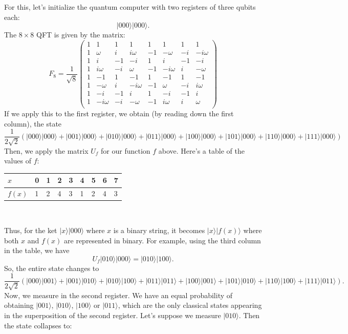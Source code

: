 \documentclass{article}
\theoremstyle{plain}
\theoremstyle{definition}
\theoremstyle{remark}
\numberwithin{theorem}{section}
\begin{document}
 For this, let's initialize the quantum computer with two registers of three qubits each:
 \[
 | 000\rangle |000 \rangle.
 \]
 The $8 \times 8$ QFT is given by the matrix:
	\[
					F_8 = \frac{1}{\sqrt{8}}
					\begin{pmatrix}
						1 & 1 & 1 & 1 & 1 & 1 & 1 & 1 \\
						1 & \omega & i & i\omega & -1 & -\omega & -i & -i\omega \\
						1 & i & -1 & -i & 1 & i & -1 & -i \\
						1 & i\omega & -i & \omega & -1 & -i\omega & i & -\omega \\
						1 & -1 & 1 & -1 & 1 & -1 & 1 & -1 \\
						1 & -\omega & i & -i\omega & -1 & \omega & -i & i\omega \\
						1 & -i & -1 & i & 1 & -i & -1 & i \\
						1 & -i\omega & -i & -\omega & -1 & i\omega & i & \omega \\
					\end{pmatrix}
					\]
If we apply this to the first register, we obtain (by reading down the first column), the state
\[
 \frac{1}{2\sqrt{2}}\left(
 |000\rangle |000\rangle + 
 |001\rangle |000\rangle +
 |010\rangle |000\rangle +
 |011\rangle |000\rangle +
 |100\rangle |000\rangle +
 |101\rangle |000\rangle +
 |110\rangle |000\rangle +
 |111\rangle |000\rangle \right)
\]
Then, we apply the matrix $U_f$ for our function $f$ above.  Here's a table of the values of $f$:\\
\begin{center}
\begin{tabular}{l|llllllll}
$x$ & 0 & 1 & 2 & 3 & 4 & 5 & 6 & 7 \\
\hline
$f(x)$ & 1 & 2 & 4 & 3 & 1 & 2 & 4 & 3 \\
\end{tabular}\\
\end{center}
Thus, for the ket $|x \rangle | 000\rangle$ where $x$ is a binary string, it becomes $|x\rangle |f(x) \rangle$ where both $x$ and $f(x)$ are represented in binary.  For example, using the third column in the table, we have
\[
U_f | 010 \rangle |000\rangle = |010\rangle |100\rangle.
\]
So, the entire state changes to
 \[
 \frac{1}{2\sqrt{2}}\left(
 |000\rangle |001\rangle + 
 |001\rangle |010\rangle +
 |010\rangle |100\rangle +
 |011\rangle |011\rangle +
 |100\rangle |001\rangle +
 |101\rangle |010\rangle +
 |110\rangle |100\rangle +
 |111\rangle |011\rangle \right).
 \]
 Now, we measure in the second register.  We have an equal probability of obtaining $|001\rangle$, $|010\rangle$, $|100\rangle$ or $|011\rangle$, which are the only classical states appearing in the superposition of the second register.  Let's suppose we measure $|010\rangle$.  Then the state collapses to:
\end{document}
